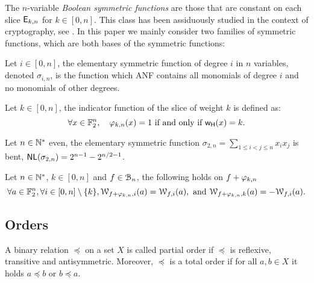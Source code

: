 \documentclass[11pt]{llncs}
\begin{document}
The $n$-variable \emph{Boolean symmetric functions} are those that are constant on each slice $\mathsf{E}_{k,n}$ for $k\in [0,n]$. 
This class has been assiduously studied in the context of cryptography, see \eg \cite{IEEE:Carlet04,IEEE:CanVid05,INDO:BraPre05,DM:SarMai07,IEEE:QFLW09,CCDS:Meaux21,IEEE:CarMea21}.
In this paper we mainly consider two families of symmetric functions, which are both bases of the symmetric functions:

\begin{definition}
Let $i\in [0,n]$, the elementary symmetric function of degree $i$ in $n$ variables, denoted $\sigma_{i,n}$, is the function which ANF contains all monomials of degree $i$ and no monomials of other degrees. 
\end{definition}
\begin{definition}
 Let $k\in [0,n]$, the indicator function of the slice of weight $k$ is defined as:
 \[\forall  x\in \mathbb{F}_2^{n}, \quad \varphi_{k,n}(x) = 1 \text{ if and only if } \mathsf{w_H}(x) = k.\]
\end{definition}

\begin{Prop}\label{prop:sigmaTwoBent}
	Let $n\in \mathbb{N}^*$ even, the elementary symmetric function $\sigma_{2,n}=\sum_{1\le i<j\le n}x_ix_j$ is bent, \ie 
	$\mathsf{NL}(\sigma_{2,n})=2^{n-1}-2^{n/2-1}$.
\end{Prop}


\begin{Prop}\label{prop:AddSym}
	Let $n\in \mathbb{N}^*$, $k\in [0,n]$ and $f \in \mathcal{B}_{n}$, the following holds on $f+\varphi_{k,n}$
	\[\forall a\in \mathbb{F}_2^n, \forall i\in [0,n]\setminus \{k\}, \mathcal{W}_{f+\varphi_{k,n},i}(a)=\mathcal{W}_{f,i}(a),\text{ and } \mathcal{W}_{f+\varphi_{k,n},k}(a)=-\mathcal{W}_{f,i}(a).\]	
\end{Prop}

\subsection{Orders}


\begin{definition}[Order]
	
A binary relation $\preceq$	on a set $X$ is called partial order if $\preceq$ is reflexive, transitive and antisymmetric. Moreover, $\preceq$ is a total order if for all $a,b\in X$ it holds $a\preceq b$ or $b \preceq a$.
	
\end{definition}
\end{document}
